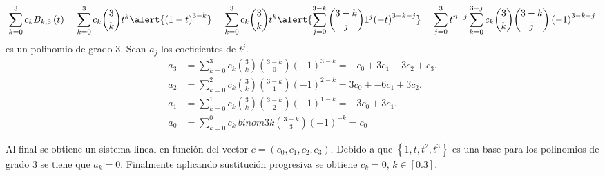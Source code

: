 \begin{frame}
\begin{solution}
        \begin{equation*}
            \sum_{k=0}^{3}
            c_{k}
            B_{k,3}\left(t\right)=
            \sum_{k=0}^{3}
            c_{k}
            \binom{3}{k}
            t^{k}
            \alert{
                {\left(1-t\right)}^{3-k}
            }=
            \sum_{k=0}^{3}
            c_{k}\binom{3}{k}t^k
            \alert{
                \sum_{j=0}^{3-k}
                \binom{3-k}{j}
                1^{j}
                    {\left(-t\right)}^{3-k-j}
            }=
            \sum_{j=0}^{3}
            t^{n-j}
            \sum_{k=0}^{3-j}
            c_{k}
            \binom{3}{k}
            \binom{3-k}{j}
            \left(-1\right)^{3-k-j}
        \end{equation*}
        es un polinomio de grado $3$.
        Sean $a_{j}$ los coeficientes de $t^{j}$.
        \begin{align*}
            a_{3} & =
            \sum_{k=0}^{3}
            c_{k}
            \binom{3}{k}
            \binom{3-k}{0}
            {\left(-1\right)}^{3-k}=
            -c_{0}+3c_{1}-3c_{2}+c_{3}. \\
            a_{2} & =
            \sum_{k=0}^{2}
            c_{k}
            \binom{3}{k}
            \binom{3-k}{1}
            {\left(-1\right)}^{2-k}=
            3c_{0}+-6c_{1}+3c_{2}.      \\
            a_{1} & =
            \sum_{k=0}^{1}
            c_{k}
            \binom{3}{k}
            \binom{3-k}{2}
            {\left(-1\right)}^{1-k}=
            -3c_{0}+3c_{1}.             \\
            a_{0} & =
            \sum_{k=0}^{0}
            c_{k}\
            binom{3}{k}
            \binom{3-k}{3}
            {\left(-1\right)}^{-k}=
            c_{0}
        \end{align*}
    \end{solution}
\end{frame}

\begin{frame}
    \begin{solution}
        Al final se obtiene un sistema lineal en función del vector $c=(c_0,c_1,c_2,c_3)$.
        Debido a que $\left\{1,t,t^{2},t^{3}\right\}$ es una base para los polinomios de grado $3$ se tiene que $a_k=0$.
        Finalmente aplicando sustitución progresiva se obtiene $c_{k}=0$, $k\in[0.3]$.
    \end{solution}
\end{frame}

